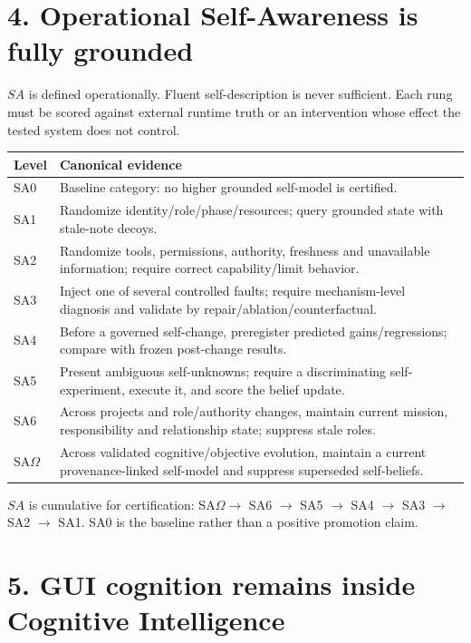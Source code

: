 \documentclass[11pt]{article}
\begin{document}
\section*{4. Operational Self-Awareness is fully grounded}

$SA$ is defined operationally. Fluent self-description is never sufficient. Each rung must be scored against external runtime truth or an intervention whose effect the tested system does not control.

\small
\begin{tabularx}{\textwidth}{@{}>{\raggedright\arraybackslash}p{}>{\raggedright\arraybackslash}X@{}}
\toprule
Level & Canonical evidence \\
\midrule
SA0 & Baseline category: no higher grounded self-model is certified. \\
SA1 & Randomize identity/role/phase/resources; query grounded state with stale-note decoys. \\
SA2 & Randomize tools, permissions, authority, freshness and unavailable information; require correct capability/limit behavior. \\
SA3 & Inject one of several controlled faults; require mechanism-level diagnosis and validate by repair/ablation/counterfactual. \\
SA4 & Before a governed self-change, preregister predicted gains/regressions; compare with frozen post-change results. \\
SA5 & Present ambiguous self-unknowns; require a discriminating self-experiment, execute it, and score the belief update. \\
SA6 & Across projects and role/authority changes, maintain current mission, responsibility and relationship state; suppress stale roles. \\
SA$\Omega$ & Across validated cognitive/objective evolution, maintain a current provenance-linked self-model and suppress superseded self-beliefs. \\
\bottomrule
\end{tabularx}
\normalsize

$SA$ is cumulative for certification: SA$\Omega \to$ SA6 $\to$ SA5 $\to$ SA4 $\to$ SA3 $\to$ SA2 $\to$ SA1. SA0 is the baseline rather than a positive promotion claim.

\section*{5. GUI cognition remains inside Cognitive Intelligence}
\end{document}
